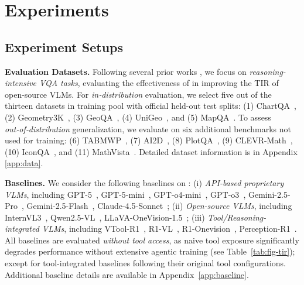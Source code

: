 

\section{Experiments}
\label{sec:exp}

\subsection{Experiment Setups}
\noindent \textbf{Evaluation Datasets.}
Following several prior works \cite{liu2025visionreasoner,huang2025vision,han2025tiger,li2025self}, we focus on \emph{reasoning-intensive VQA tasks}, evaluating the effectiveness of \env{} in improving the TIR of open-source VLMs.
For \emph{in‑distribution} evaluation, we select five out of the thirteen datasets in \env{} training pool with official held-out test splits: (1) ChartQA~\cite{masry2022chartqa}, (2) Geometry3K~\cite{lu2021inter}, (3) GeoQA~\cite{chen2021geoqa}, (4) UniGeo~\cite{chen2022unigeo}, and (5) MapQA~\cite{chang2022mapqa}. 
To assess \emph{out‑of‑distribution} generalization, we evaluate on six additional benchmarks not used for training: (6) TABMWP~\cite{lu2022dynamic}, (7) AI2D~\cite{kembhavi2016diagram}, (8) PlotQA~\cite{methani2020plotqa}, (9) CLEVR-Math~\cite{lindstrom2022clevr}, (10) IconQA~\cite{lu2021iconqa}, and (11) MathVista~\cite{lu2023mathvista}.
Detailed dataset information is in Appendix \ref{app:data}.

\noindent \textbf{Baselines.}
We consider the following baselines on \env{}:
(i) \emph{API-based proprietary VLMs}, including GPT-5~\cite{gpt5}, GPT-5-mini~\cite{gpt5}, GPT-o4-mini~\cite{openai2025introducing}, GPT-o3~\cite{openai2025introducing}, Gemini-2.5-Pro~\cite{comanici2025gemini}, Gemini-2.5-Flash~\cite{comanici2025gemini}, Claude-4.5-Sonnet~\cite{Claude};
(ii) \emph{Open-source VLMs}, including InternVL3~\cite{zhu2025internvl3}, Qwen2.5-VL~\cite{bai2025qwen2}, LLaVA-OneVision-1.5~\cite{an2025llava};
(iii) \emph{Tool/Reasoning-integrated VLMs}, including VTool-R1~\cite{wu2025vtool}, R1-VL~\cite{zhang2025r1}, R1-Onevision~\cite{yang2025r1}, Perception-R1~\cite{yu2025perception}.
All baselines are evaluated \emph{without tool access}, as naive tool exposure significantly degrades performance without extensive agentic training (see Table~\ref{tab:fig-tir}); except for tool-integrated baselines following their original tool configurations.
Additional baseline details are available in Appendix~\ref{app:baseline}.

